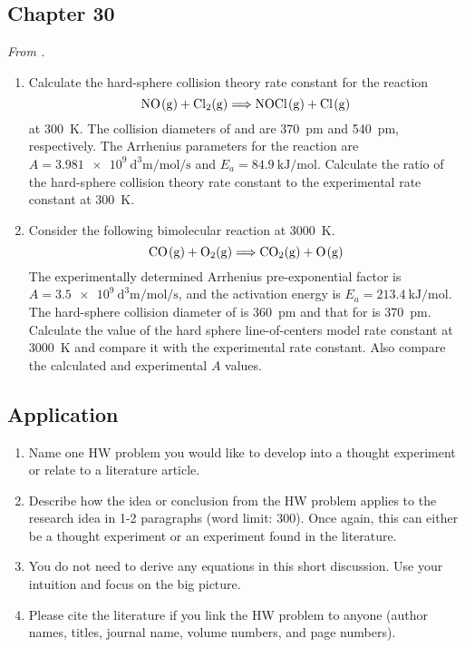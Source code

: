 \documentclass[../psets.tex]{subfiles}
\begin{document}
\subsection*{Chapter 30}
\emph{From \textcite{bib:McQuarrieSimon}.}
\begin{enumerate}[label={\textbf{30-\arabic*.}},leftmargin=3.5em]
    \item Calculate the hard-sphere collision theory rate constant for the reaction
    \begin{equation*}
        \ce{NO(g) + Cl2(g)} \Longrightarrow \ce{NOCl(g) + Cl(g)}
    \end{equation*}
    at \SI{300}{\kelvin}. The collision diameters of  and  are \SI{370}{\pico\meter} and \SI{540}{\pico\meter}, respectively. The Arrhenius parameters for the reaction are $A=\SI{3.981e9}{\cubic\deci\meter\per\mole\per\second}$ and $E_a=\SI{84.9}{\kilo\joule\per\mole}$. Calculate the ratio of the hard-sphere collision theory rate constant to the experimental rate constant at \SI{300}{\kelvin}.
    \setcounter{enumi}{4}
    \item Consider the following bimolecular reaction at \SI{3000}{\kelvin}.
    \begin{equation*}
        \ce{CO(g) + O2(g)} \Longrightarrow \ce{CO2(g) + O(g)}
    \end{equation*}
    The experimentally determined Arrhenius pre-exponential factor is $A=\SI{3.5e9}{\cubic\deci\meter\per\mole\per\second}$, and the activation energy is $E_a=\SI{213.4}{\kilo\joule\per\mole}$. The hard-sphere collision diameter of  is \SI{360}{\pico\meter} and that for  is \SI{370}{\pico\meter}. Calculate the value of the hard sphere line-of-centers model rate constant at \SI{3000}{\kelvin} and compare it with the experimental rate constant. Also compare the calculated and experimental $A$ values.
\end{enumerate}


\subsection*{Application}
\begin{enumerate}[label={\arabic*)}]
    \item Name one HW problem you would like to develop into a thought experiment or relate to a literature article.
    \item Describe how the idea or conclusion from the HW problem applies to the research idea in 1-2 paragraphs (word limit: 300). Once again, this can either be a thought experiment or an experiment found in the literature.
    \item You do not need to derive any equations in this short discussion. Use your intuition and focus on the big picture.
    \item Please cite the literature if you link the HW problem to anyone (author names, titles, journal name, volume numbers, and page numbers).
\end{enumerate}
\end{document}
